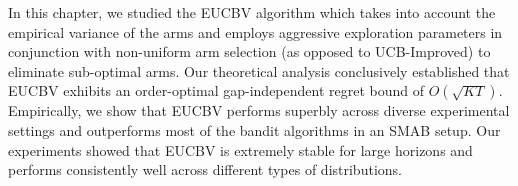 In this chapter, we studied the EUCBV algorithm which takes into account the empirical variance of the arms and employs aggressive exploration parameters in conjunction with non-uniform arm selection (as opposed to UCB-Improved) to eliminate sub-optimal arms. Our theoretical analysis conclusively established that EUCBV exhibits an order-optimal gap-independent regret bound of $O\left(\sqrt{KT}\right)$. Empirically, we show that EUCBV performs superbly across diverse experimental settings and outperforms most of the bandit algorithms in an SMAB setup. Our experiments showed that EUCBV is extremely stable for large horizons and performs consistently well across different types of distributions. 

